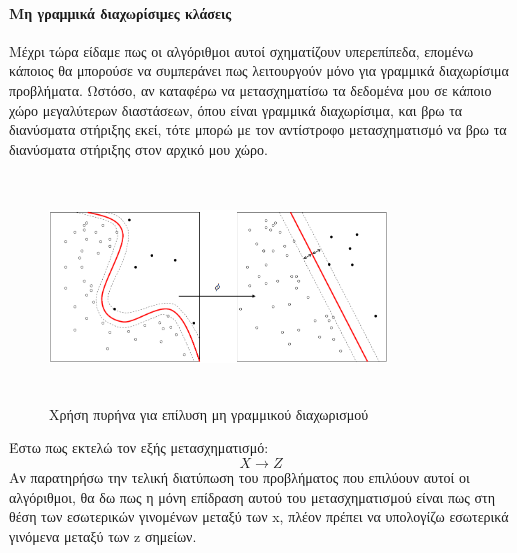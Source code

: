 \documentclass{article}
\begin{document}
 \paragraph{Μη γραμμικά διαχωρίσιμες κλάσεις}
 Μέχρι τώρα είδαμε πως οι αλγόριθμοι αυτοί σχηματίζουν υπερεπίπεδα, επομένω κάποιος θα μπορούσε να συμπεράνει πως λειτουργούν μόνο για γραμμικά διαχωρίσιμα προβλήματα. Ωστόσο, αν καταφέρω να μετασχηματίσω τα δεδομένα μου σε κάποιο χώρο μεγαλύτερων διαστάσεων, όπου είναι γραμμικά διαχωρίσιμα, και βρω τα διανύσματα στήριξης εκεί, τότε μπορώ με τον αντίστροφο μετασχηματισμό να βρω τα διανύσματα στήριξης στον αρχικό μου χώρο.
 \begin{figure}[H]
	\centering			
    \includegraphics[width=0.8\textwidth, height=6cm]{kernel.png}
    \caption[Χρήση πυρήνα για επίλυση μη γραμμικού διαχωρισμού]{Χρήση πυρήνα για επίλυση μη γραμμικού διαχωρισμού}
 \end{figure}
 
 Έστω πως εκτελώ τον εξής μετασχηματισμό:
 $$X \rightarrow Z$$
 Αν παρατηρήσω την τελική διατύπωση του προβλήματος που επιλύουν αυτοί οι αλγόριθμοι, θα δω πως η μόνη επίδραση αυτού του μετασχηματισμού είναι πως στη θέση των εσωτερικών γινομένων μεταξύ των x, πλέον πρέπει να υπολογίζω εσωτερικά γινόμενα μεταξύ των z σημείων.
 
\end{document}
